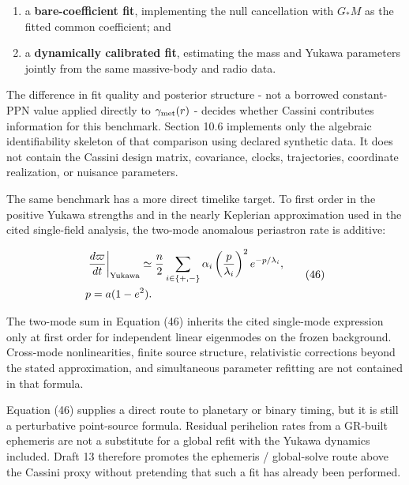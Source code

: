 \documentclass[
  american,
  11pt,
  letterpaper,
]{article}
\providecommand{\tightlist}{%
  \setlength{\itemsep}{0pt}\setlength{\parskip}{0pt}}
\begin{document}
\begin{enumerate}
\def\labelenumi{\arabic{enumi}.}
\tightlist
\item
  a \textbf{bare-coefficient fit}, implementing the null cancellation with \(G_*M\) as the fitted common coefficient; and
\item
  a \textbf{dynamically calibrated fit}, estimating the mass and Yukawa parameters jointly from the same massive-body and radio data.
\end{enumerate}

The difference in fit quality and posterior structure - not a borrowed constant-PPN value applied directly to \(\gamma_{\rm met}(r)\) - decides whether Cassini contributes information for this benchmark. Section 10.6 implements only the algebraic identifiability skeleton of that comparison using declared synthetic data. It does not contain the Cassini design matrix, covariance, clocks, trajectories, coordinate realization, or nuisance parameters.

The same benchmark has a more direct timelike target. To first order in the positive Yukawa strengths and in the nearly Keplerian approximation used in the cited single-field analysis, the two-mode anomalous periastron rate is additive:

\begin{equation}
\begin{aligned}
& \left.\frac{d\varpi}{dt}\right|_{\rm Yukawa}
\simeq \frac{n}{2}
\sum_{i\in\{+,-\}}
\alpha_i
\left(\frac{p}{\lambda_i}\right)^2
e^{-p/\lambda_i}, \\
& p=a(1-e^2).
\end{aligned}
\tag{46}
\end{equation}

The two-mode sum in Equation (46) inherits the cited single-mode expression only at first order for independent linear eigenmodes on the frozen background. Cross-mode nonlinearities, finite source structure, relativistic corrections beyond the stated approximation, and simultaneous parameter refitting are not contained in that formula.

Equation (46) supplies a direct route to planetary or binary timing, but it is still a perturbative point-source formula. Residual perihelion rates from a GR-built ephemeris are not a substitute for a global refit with the Yukawa dynamics included. Draft 13 therefore promotes the ephemeris / global-solve route above the Cassini proxy without pretending that such a fit has already been performed.
\end{document}
